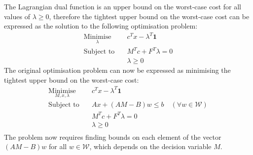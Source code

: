 The Lagrangian dual function is an upper bound on the worst-case cost for all values of $\lambda \ge 0$, therefore the tightest upper bound on the worst-case cost can be expressed as the solution to the following optimisation problem:
\begin{align*}
    \underset{\lambda}{\text{Minimise}} \quad & c^Tx - \lambda^T\mathbf{1} \\
    \text{Subject to} \quad & M^Tc + F^T\lambda = 0 \\
    & \lambda \ge 0
\end{align*}
The original optimisation problem can now be expressed as minimising the tightest upper bound on the worst-case cost:
\begin{align*}
    \underset{M, x, \lambda}{\text{Minimise}} \quad & c^Tx - \lambda^T\mathbf{1} \\
    \text{Subject to} \quad & Ax + (AM - B)w \le b \quad (\forall w\in\mathcal{W}) \\
    & M^Tc + F^T\lambda = 0 \\
    & \lambda \ge 0 \\
\end{align*}
The problem now requires finding bounds on each element of the vector $(AM - B)w$ for all $w\in\mathcal{W}$, which depends on the decision variable $M$.
